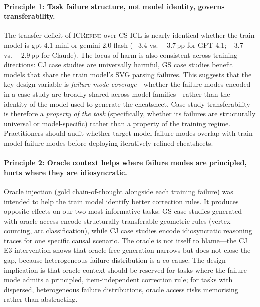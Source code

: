 \paragraph{Principle 1: Task failure structure, not model identity, governs transferability.}
The transfer deficit of \textsc{ICRefine} over CS-ICL is nearly identical whether the
train model is gpt-4.1-mini or gemini-2.0-flash ($-3.4$ vs.\ $-3.7$\,pp for GPT-4.1;
$-3.7$ vs.\ $-2.9$\,pp for Claude).
The locus of harm is also consistent across training directions: CJ case studies are
universally harmful, GS case studies benefit models that share the train model's SVG parsing
failures.
This suggests that the key design variable is \emph{failure mode coverage}---whether the
failure modes encoded in a case study are broadly shared across model families---rather than
the identity of the model used to generate the cheatsheet.
Case study transferability is therefore a \emph{property of the task} (specifically, whether
its failures are structurally universal or model-specific) rather than a property of the
training regime.
Practitioners should audit whether target-model failure modes overlap with train-model failure
modes before deploying iteratively refined cheatsheets.

\paragraph{Principle 2: Oracle context helps where failure modes are principled, hurts where they are idiosyncratic.}
Oracle injection (gold chain-of-thought alongside each training failure) was intended to help
the train model identify better correction rules.
It produces opposite effects on our two most informative tasks: GS case studies generated
with oracle access encode structurally transferable geometric rules (vertex counting, arc
classification), while CJ case studies encode idiosyncratic reasoning traces for one specific
causal scenario.
The oracle is not itself to blame---the CJ E3 intervention shows that oracle-free generation
narrows but does not close the gap, because heterogeneous failure distribution is a
co-cause.
The design implication is that oracle context should be reserved for tasks where the failure
mode admits a principled, item-independent correction rule; for tasks with dispersed,
heterogeneous failure distributions, oracle access risks memorising rather than abstracting.

